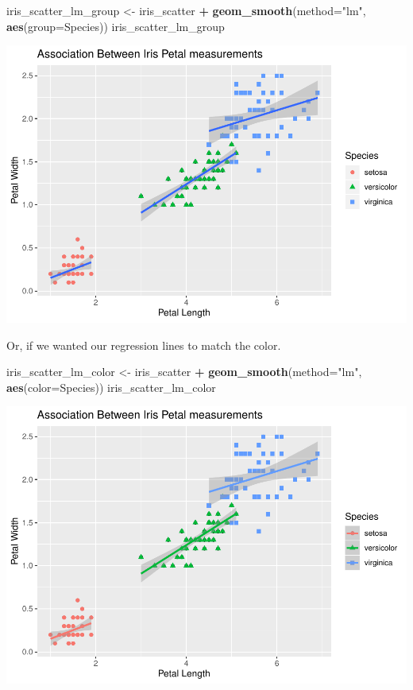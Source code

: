 \documentclass[]{article}
\newenvironment{Shaded}{\begin{snugshade}}{\end{snugshade}}
\newcommand{\DataTypeTok}[1]{\textcolor[rgb]{0.13,0.29,0.53}{#1}}
\newcommand{\KeywordTok}[1]{\textcolor[rgb]{0.13,0.29,0.53}{\textbf{#1}}}
\newcommand{\NormalTok}[1]{#1}
\newcommand{\OperatorTok}[1]{\textcolor[rgb]{0.81,0.36,0.00}{\textbf{#1}}}
\newcommand{\StringTok}[1]{\textcolor[rgb]{0.31,0.60,0.02}{#1}}
\begin{document}
\begin{Shaded}
\begin{Highlighting}[]
\NormalTok{iris_scatter_lm_group <-}\StringTok{ }\NormalTok{iris_scatter }\OperatorTok{+}
\StringTok{  }\KeywordTok{geom_smooth}\NormalTok{(}\DataTypeTok{method=}\StringTok{"lm"}\NormalTok{, }\KeywordTok{aes}\NormalTok{(}\DataTypeTok{group=}\NormalTok{Species))}
\NormalTok{iris_scatter_lm_group}
\end{Highlighting}
\end{Shaded}

\includegraphics{figures/unnamed-chunk-9-1.pdf}

Or, if we wanted our regression lines to match the color.

\begin{Shaded}
\begin{Highlighting}[]
\NormalTok{iris_scatter_lm_color <-}\StringTok{ }\NormalTok{iris_scatter }\OperatorTok{+}\StringTok{ }
\StringTok{  }\KeywordTok{geom_smooth}\NormalTok{(}\DataTypeTok{method=}\StringTok{"lm"}\NormalTok{, }\KeywordTok{aes}\NormalTok{(}\DataTypeTok{color=}\NormalTok{Species))}
\NormalTok{iris_scatter_lm_color}
\end{Highlighting}
\end{Shaded}

\includegraphics{figures/unnamed-chunk-10-1.pdf}
\end{document}
